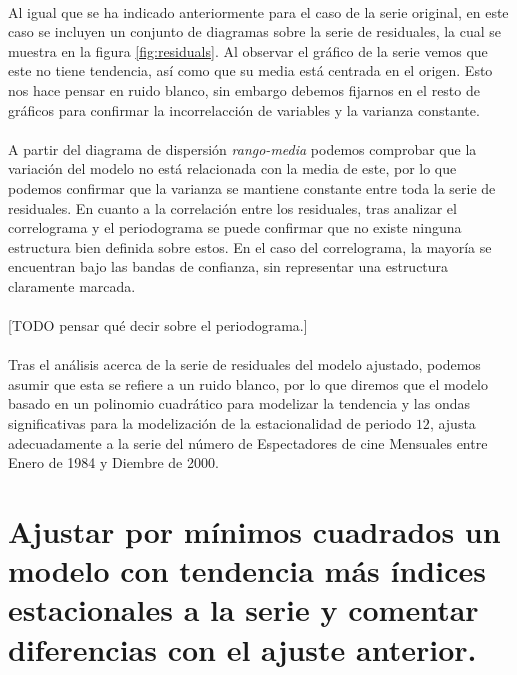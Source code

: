 \documentclass[a4paper, spanish]{article}
\begin{document}
    \paragraph{}
    Al igual que se ha indicado anteriormente para el caso de la serie original, en este caso se incluyen un conjunto de diagramas sobre la serie de residuales, la cual se muestra en la figura \ref{fig:residuals}. Al observar el gráfico de la serie vemos que este no tiene tendencia, así como que su media está centrada en el origen. Esto nos hace pensar en ruido blanco, sin embargo debemos fijarnos en el resto de gráficos para confirmar la incorrelacción de variables y la varianza constante.

    \paragraph{}
    A partir del diagrama de dispersión \emph{rango-media} podemos comprobar que la variación del modelo no está relacionada con la media de este, por lo que podemos confirmar que la varianza se mantiene constante entre toda la serie de residuales. En cuanto a la correlación entre los residuales, tras analizar el correlograma y el periodograma se puede confirmar que no existe ninguna estructura bien definida sobre estos. En el caso del correlograma, la mayoría se encuentran bajo las bandas de confianza, sin representar una estructura claramente marcada.

    \paragraph{}
    [TODO pensar qué decir sobre el periodograma.]

    \paragraph{}
    Tras el análisis acerca de la serie de residuales del modelo ajustado, podemos asumir que esta se refiere a un ruido blanco, por lo que diremos que el modelo basado en un polinomio cuadrático para modelizar la tendencia  y las ondas significativas para la modelización de la estacionalidad de periodo $12$, ajusta adecuadamente a la serie del número de Espectadores de cine Mensuales entre Enero de 1984 y Diembre de 2000.

  \section{Ajustar por mínimos cuadrados un modelo con tendencia más índices estacionales a la serie y comentar diferencias con el ajuste anterior.}
\end{document}
